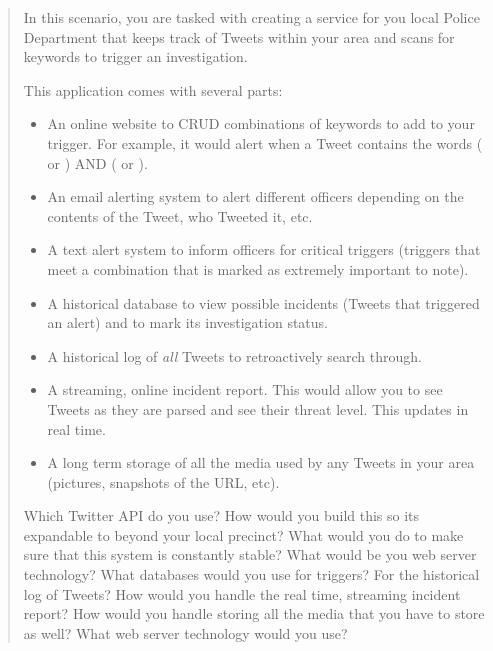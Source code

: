 \documentclass[12pt, letterpaper]{homework}
\begin{document}
\begin{quote}
    In this scenario, you are tasked with creating a service for you local Police
    Department that keeps track of Tweets within your area and scans for keywords to
    trigger an investigation.

    This application comes with several parts:
    \begin{itemize}
        \item An online website to CRUD combinations of keywords to add to your
            trigger. For example, it would alert when a Tweet contains the words
            ( or ) AND ( or
            ).
        \item An email alerting system to alert different officers depending on the
            contents of the Tweet, who Tweeted it, etc.
        \item A text alert system to inform officers for critical triggers (triggers
            that meet a combination that is marked as extremely important to note).
        \item A historical database to view possible incidents (Tweets that
            triggered an alert) and to mark its investigation status.
        \item A historical log of \textit{all} Tweets to retroactively search
            through.
        \item A streaming, online incident report. This would allow you to see
            Tweets as they are parsed and see their threat level. This updates in
            real time.
        \item A long term storage of all the media used by any Tweets in your area
            (pictures, snapshots of the URL, etc).
    \end{itemize}

    Which Twitter API do you use? How would you build this so its expandable to
    beyond your local precinct? What would you do to make sure that this system is
    constantly stable? What would be you web server technology? What databases would
    you use for triggers? For the historical log of Tweets? How would you handle the
    real time, streaming incident report? How would you handle storing all the media
    that you have to store as well? What web server technology would you use?
\end{quote}
\end{document}
